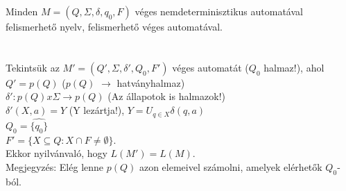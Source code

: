 \begin{frame}
\begin{tcolorbox}[title={Tétel: Nemdeterminisztikus automata}]
Minden $M = (Q, \Sigma , \delta , q_0, F)$ véges nemdeterminisztikus automatával felismerhető nyelv, felismerhető véges automatával.\\
\tcblower
\msmallskip
\underline{}\\
\mmedskip
\\
Tekintsük az $M' = (Q', \Sigma , {\delta}', Q_0, F')$ véges automatát ($Q_0$ halmaz!), ahol\\
$Q' = p(Q)$ ($p(Q)$ $\rightarrow$ hatványhalmaz)\\
${\delta}' : p(Q) x \Sigma \rightarrow p(Q)$ (Az állapotok is halmazok!)\\
${\delta}'(X, a) = \widehat{Y}$ (Y lezártja!), $Y = U_{q \in X} \delta(q, a)$\\
$Q_0 = \widehat{\{q_0\}}$\\
$F' = \{X \subseteq Q : X \cap F \neq \emptyset \}$.\\
Ekkor nyilvánvaló, hogy $L(M') = L(M)$.\\
Megjegyzés: Elég lenne $p(Q)$ azon elemeivel számolni, amelyek elérhetők $Q_0$-ból.

\end{tcolorbox}

\end{frame}

